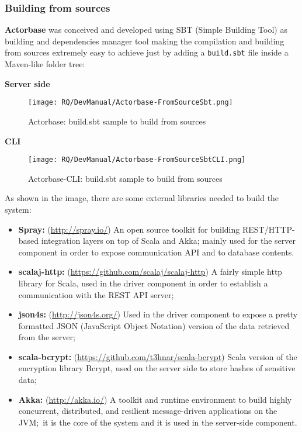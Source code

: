 \documentclass{scalatekids-article}
\begin{document}
\subsubsection{Building from sources}

\textbf{Actorbase} was conceived and developed using SBT (Simple Building Tool)
as building and dependencies manager tool making the compilation and building
from sources extremely easy to achieve just by adding a \verb=build.sbt= file
inside a Maven-like folder tree:

\textbf{Server side}

\begin{figure}[H]
  \begin{center}
    \texttt{[image: RQ/DevManual/Actorbase-FromSourceSbt.png]}
    \caption{Actorbase: build.sbt sample to build from sources}
  \end{center}
\end{figure}

\textbf{CLI}

\begin{figure}[H]
  \begin{center}
    \texttt{[image: RQ/DevManual/Actorbase-FromSourceSbtCLI.png]}
    \caption{Actorbase-CLI: build.sbt sample to build from sources}
  \end{center}
\end{figure}

As shown in the image, there are some external libraries needed to build the system:
\begin{itemize}
\item \textbf{Spray:} (\url{http://spray.io/}) An open source toolkit for building REST/HTTP-based
  integration layers on top of Scala and Akka; mainly used for the server
  component in order to expose communication API and to
   database contents.
\item \textbf{scalaj-http:} (\url{https://github.com/scalaj/scalaj-http}) A fairly simple http library for Scala, used in the
  driver component in order to establish a communication with the REST API server;\
\item \textbf{json4s:} (\url{http://json4s.org/}) Used in the driver component to expose a pretty formatted
  JSON (JavaScript Object Notation) version of the data retrieved from the server;
\item \textbf{scala-bcrypt:} (\url{https://github.com/t3hnar/scala-bcrypt}) Scala version of the encryption library Bcrypt,
  used on the server side to store hashes of sensitive data;
\item \textbf{Akka:} (\url{http://akka.io/}) A toolkit and runtime environment to build highly concurrent,
  distributed, and resilient message-driven applications on the JVM;\ it is the core of
  the system and it is used in the server-side component.
\end{itemize}
\end{document}
